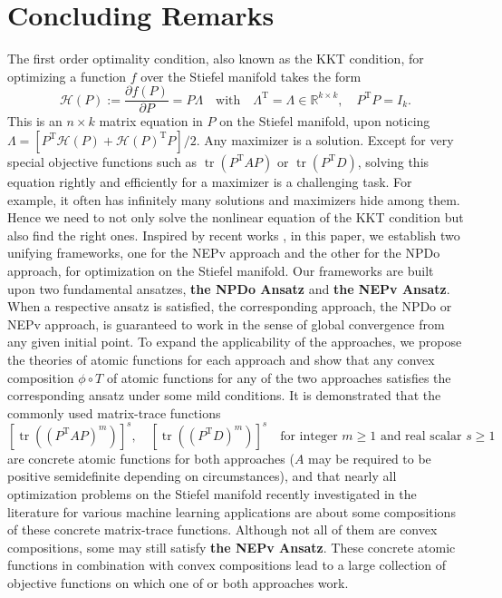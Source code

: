 \documentclass[11pt]{article}
\def\bbR{\mathbb{R}}
\def\scrH{\mathscr{H}}
\DeclareMathOperator{\tr}{tr}
\DeclareMathOperator{\T}{T}
\theoremstyle{definition}
\numberwithin{equation}{section}
\begin{document}
\section{Concluding Remarks}\label{sec:conclu}
The first order optimality condition, also known as the KKT condition, for optimizing a function $f$ over the Stiefel manifold takes the form
\begin{equation}\label{eq:KKT'}
\scrH(P):=\frac{\partial f(P)}{\partial P}=P\Lambda
\quad \mbox{with} \quad
\Lambda^{\T}=\Lambda\in\bbR^{k\times k},\quad P^{\T}P=I_k.
\end{equation}
This is an $n\times k$ matrix equation in $P$ on the Stiefel manifold, upon noticing $\Lambda=[P^{\T}\scrH(P)+\scrH(P)^{\T}P]/2$.
Any maximizer is a solution. Except for very special objective functions such as $\tr(P^{\T}AP)$ or $\tr(P^{\T}D)$, solving this equation rightly
and efficiently for a maximizer is a challenging task. For example, it often has infinitely many solutions and maximizers
hide among them. Hence we  need to not only solve the nonlinear equation of the KKT condition but also  find the right ones.
Inspired by recent works \cite{wazl:2023,wazl:2022a,zhys:2020,zhli:2014a,zhli:2014b,zhwb:2022}, in this paper,
we establish two unifying frameworks, one for the NEPv approach and the other for the NPDo approach, for optimization on the Stiefel manifold.
Our frameworks are built upon two fundamental ansatzes,
{\bf the NPDo Ansatz} and {\bf the NEPv Ansatz}. When a respective ansatz is
satisfied, the corresponding approach, the NPDo or NEPv approach, is guaranteed to work
in the sense of  global convergence from any given initial point.
To expand the applicability of the approaches, we propose the theories of atomic functions for each approach
and show that any convex composition $\phi\circ T$ of atomic functions for any of the two approaches satisfies the corresponding ansatz under some mild conditions.
It is demonstrated that the
commonly used
matrix-trace functions
$$
[\tr((P^{\T}AP)^m)]^s,\quad
        [\tr((P^{\T}D)^m)]^s\quad
\mbox{for integer $m\ge 1$ and real scalar $s\ge 1$}
$$
are concrete atomic functions for both approaches ($A$ may be required to be positive semidefinite depending on circumstances),
and that nearly all optimization problems on the Stiefel manifold recently investigated in the literature
for various machine learning applications are about some compositions of these concrete matrix-trace functions. Although not all of them are convex compositions, some may still satisfy {\bf the NEPv Ansatz}.
These concrete atomic functions in combination with convex compositions lead to a large collection of objective functions on which
one of or both  approaches work.
\end{document}
